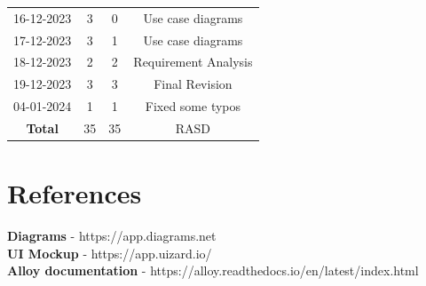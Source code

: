 \documentclass[12pt, a4paper]{report}
\begin{document}
\begin{table}[H]
\begin{tabular}{cccc}
            16-12-2023      & 3                         & 0                             & Use case diagrams                             \\
            17-12-2023      & 3                         & 1                             & Use case diagrams                             \\
            18-12-2023      & 2                         & 2                             & Requirement Analysis                          \\
            19-12-2023      & 3                         & 3                             & Final Revision                                \\ 
            04-01-2024      & 1                         & 1                             & Fixed some typos                              \\ \hline
            \textbf{Total}  & 35                        & 35                            & RASD                                          \\  
        \end{tabular}
    \end{table}

\chapter{References}
    \textbf{Diagrams} - https://app.diagrams.net \\
    \textbf{UI Mockup} - https://app.uizard.io/ \\
    \textbf{Alloy documentation} - https://alloy.readthedocs.io/en/latest/index.html
\end{document}
